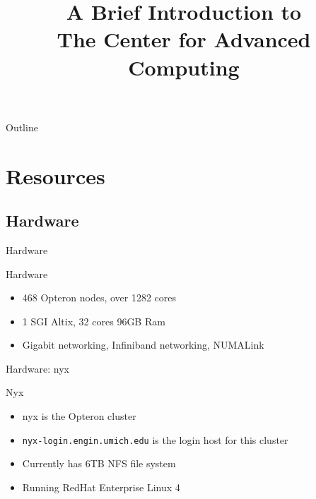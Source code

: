 \documentclass{beamer}
\title[CAC Intro] {A Brief Introduction to\\ The Center for Advanced Computing}
\begin{document}
  \begin{frame}
    \titlepage
  \end{frame}

  \begin{frame}{Outline}
    \tableofcontents
  \end{frame}
  
  \section{Resources}
  \subsection {Hardware}
  \begin{frame}{Hardware}
   \begin{block}{Hardware}
    \begin{itemize}
    \item 468 Opteron nodes, over 1282 cores
    \item 1 SGI Altix, 32 cores 96GB Ram
    \item Gigabit networking, Infiniband networking, NUMALink
    \end{itemize}
   \end{block}
  \end{frame}
  \begin{frame}{Hardware: nyx}
   \begin{block}{Nyx}
    \begin{itemize}
    \item nyx is the Opteron cluster
    \item \texttt{nyx-login.engin.umich.edu} is
      the login host for this cluster
    \item Currently has 6TB NFS file system
    \item Running RedHat Enterprise Linux 4
    \end{itemize}
   \end{block}
  \end{frame}
\end{document}
